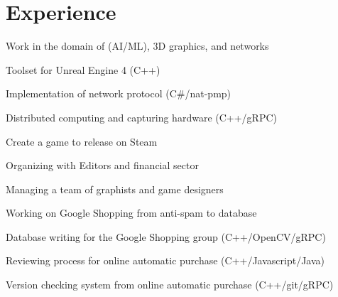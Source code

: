 \documentclass[a4paper]{deedy-resume} %
\begin{document}
\hfill%
%
%
\begin{minipage}[t]{0.66\textwidth} %


\section{Experience}


	Work in the domain of (AI/ML), 3D graphics, and networks
	\vspace{\topsep} %
	\begin{tightitemize}
		\item Toolset for Unreal Engine 4 (C++)
		\item Implementation of network protocol (C\#/nat-pmp)
		\item Distributed computing and capturing hardware (C++/gRPC)
	\end{tightitemize}

\sectionspace


	Create a game to release on Steam
	\begin{tightitemize}
		\item Organizing with Editors and financial sector
		\item Managing a team of graphists and game designers
	\end{tightitemize}

\sectionspace %


	Working on Google Shopping from anti-spam to database
	\begin{tightitemize}
		\item Database writing for the Google Shopping group (C++/OpenCV/gRPC)
		\item Reviewing process for online automatic purchase (C++/Javascript/Java)
		\item Version checking system from online automatic purchase (C++/git/gRPC)
	\end{tightitemize}


\end{minipage}
\end{document}
